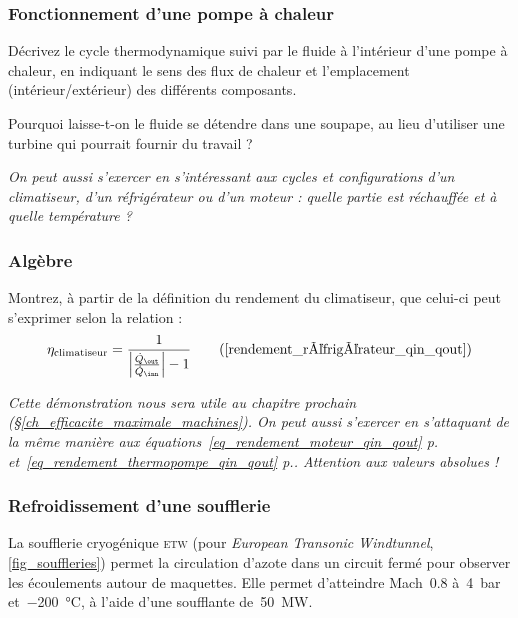 \subsubsection[Fonctionnement d’une pompe à chaleur]{\onlyframabook{\hspace{-0.5em}}Fonctionnement d’une pompe à chaleur}%
\label{exo_fonctionnement_thermopompe}

	Décrivez le cycle thermodynamique suivi par le fluide à l’intérieur d’une pompe à chaleur, en indiquant le sens des flux de chaleur et l’emplacement (intérieur/extérieur) des différents composants.
	
	Pourquoi laisse-t-on le fluide se détendre dans une soupape, au lieu d’utiliser une turbine qui pourrait fournir du travail ?
	
	\textit{On peut aussi s’exercer en s’intéressant aux cycles et configurations d’un climatiseur, d’un réfrigérateur ou d’un moteur : quelle partie est réchauffée et à quelle température ?}


\subsubsection{Algèbre}
\label{exo_algebre_rendement_climatiseur}

	Montrez, à partir de la définition du rendement du climatiseur, que celui-ci peut s’exprimer selon la relation :
			\begin{equation}
				\eta_\text{climatiseur} = \frac{1}{\left| \frac{\dot Q_\out}{\dot Q_\inn} \right| - 1} \tag{\ref{rendement_réfrigérateur_qin_qout}}
			\end{equation}
	
	\textit{Cette démonstration nous sera utile au chapitre prochain (\S\ref{ch_efficacite_maximale_machines}). On peut aussi s’exercer en s’attaquant de la même manière aux équations~\ref{eq_rendement_moteur_qin_qout} p.\pageref{eq_rendement_moteur_qin_qout} et~\ref{eq_rendement_thermopompe_qin_qout} p.\pageref{eq_rendement_thermopompe_qin_qout}. Attention aux valeurs absolues !}
	
	
\subsubsection{Refroidissement d’une soufflerie}
\label{exo_refrigeration_soufflerie}

	La soufflerie cryogénique \textsc{etw} (pour \textit{European Transonic Windtunnel}, \cref{fig_souffleries}) permet la circulation d’azote dans un circuit fermé pour observer les écoulements autour de maquettes. Elle permet d’atteindre Mach~\num{0,8} à~\SI{4}{\bar} et~\SI{-200}{\celsius}, à l’aide d’une soufflante de~\SI{50}{\mega\watt}.
	
